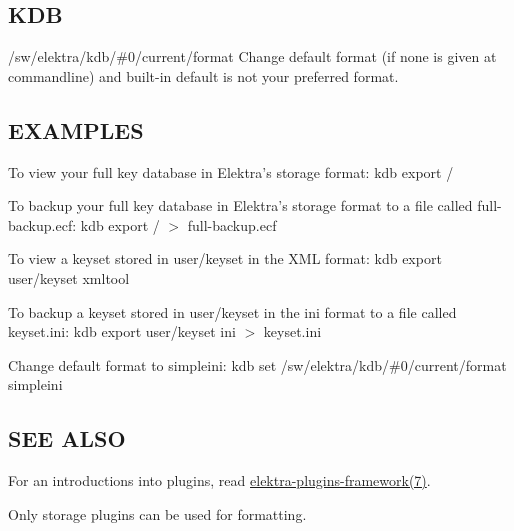 \subsection*{K\+D\+B}


\begin{DoxyItemize}
\item {\ttfamily /sw/elektra/kdb/\#0/current/format} Change default format (if none is given at commandline) and built-\/in default is not your preferred format.
\end{DoxyItemize}

\subsection*{E\+X\+A\+M\+P\+L\+E\+S}

To view your full key database in Elektra's {\ttfamily storage} format\+: {\ttfamily kdb export /}

To backup your full key database in Elektra's {\ttfamily storage} format to a file called {\ttfamily full-\/backup.\+ecf}\+: {\ttfamily kdb export / $>$ full-\/backup.\+ecf}

To view a keyset stored in {\ttfamily user/keyset} in the X\+M\+L format\+: {\ttfamily kdb export user/keyset xmltool}

To backup a keyset stored in {\ttfamily user/keyset} in the {\ttfamily ini} format to a file called {\ttfamily keyset.\+ini}\+: {\ttfamily kdb export user/keyset ini $>$ keyset.\+ini}

Change default format to {\ttfamily simpleini}\+: {\ttfamily kdb set /sw/elektra/kdb/\#0/current/format simpleini}

\subsection*{S\+E\+E A\+L\+S\+O}


\begin{DoxyItemize}
\item For an introductions into plugins, read \hyperlink{md_doc_help_elektra-plugins-framework_doc_help_elektra-plugins-framework_md}{elektra-\/plugins-\/framework(7)}.
\item Only storage plugins can be used for formatting. 
\end{DoxyItemize}